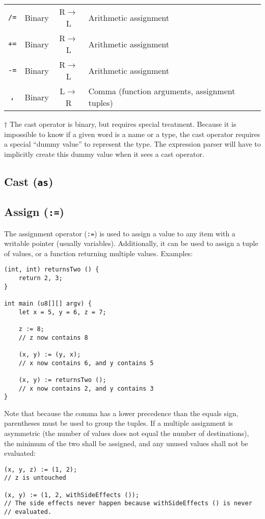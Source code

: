\documentclass{article}
\begin{document}
\begin{center}
\begin{threeparttable}
\begin{tabular}{|c|c|c|l|}
      \texttt{/=} & Binary & R$\to$L & Arithmetic assignment \\
      \texttt{+=} & Binary & R$\to$L & Arithmetic assignment \\
      \texttt{-=} & Binary & R$\to$L & Arithmetic assignment \\ \hline
      \texttt{,} & Binary & L$\to$R & Comma (function arguments, assignment tuples) \\ \hline
    \end{tabular}
    \begin{tablenotes}
      \item{$\dagger$ \small{The cast operator is binary, but requires special treatment.
          Because it is impossible to know if a given word is a name or a type, the
          cast operator requires a special ``dummy value'' to represent the type. The
          expression parser will have to implicitly create this dummy value when it sees
          a cast operator.}}
    \end{tablenotes}
  \end{threeparttable}
\end{center}

\subsection{Cast (\texttt{as})}
\label{sub:operators:cast}

\subsection{Assign (\texttt{:=})}
\label{sub:operators:assign}
The assignment operator (\texttt{:=}) is used to assign a value to any item with
a writable pointer (usually variables). Additionally, it can be used to assign
a tuple of values, or a function returning multiple values.
Examples:
\begin{verbatim}
(int, int) returnsTwo () {
    return 2, 3;
}

int main (u8[][] argv) {
    let x = 5, y = 6, z = 7;

    z := 8;
    // z now contains 8

    (x, y) := (y, x);
    // x now contains 6, and y contains 5

    (x, y) := returnsTwo ();
    // x now contains 2, and y contains 3
}
\end{verbatim}

Note that because the comma has a lower precedence than the equals sign,
parentheses must be used to group the tuples. If a multiple assignment is
asymmetric (the number of values does not equal the number of destinations),
the minimum of the two shall be assigned, and any unused values shall not be
evaluated:
\begin{verbatim}
(x, y, z) := (1, 2);
// z is untouched

(x, y) := (1, 2, withSideEffects ());
// The side effects never happen because withSideEffects () is never
// evaluated.
\end{verbatim}
\end{document}
